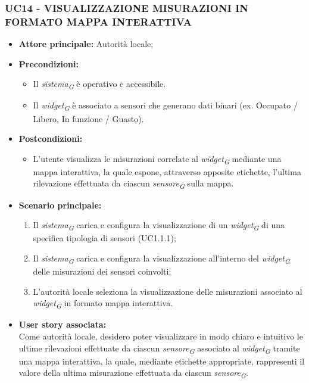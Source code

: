 \subsubsection{UC14 - VISUALIZZAZIONE MISURAZIONI IN FORMATO MAPPA INTERATTIVA}
\begin{itemize}
    \item \textbf{Attore principale:} Autorità locale;
    \item \textbf{Precondizioni:}
        \begin{itemize}
            \item Il \textit{sistema}\textsubscript{\textit{G}} è operativo e accessibile.
            \item Il \textit{widget}\textsubscript{\textit{G}} è associato a sensori che generano dati binari (ex. Occupato / Libero, In funzione / Guasto).
        \end{itemize}
    \item \textbf{Postcondizioni:}
        \begin{itemize}
            \item L'utente visualizza le misurazioni correlate al \textit{widget}\textsubscript{\textit{G}} mediante una mappa interattiva, la quale espone, attraverso apposite etichette, l'ultima rilevazione effettuata da ciascun \textit{sensore}\textsubscript{\textit{G}} sulla mappa.
        \end{itemize}
    \item \textbf{Scenario principale:}
        \begin{enumerate}
            \item Il \textit{sistema}\textsubscript{\textit{G}} carica e configura la visualizzazione di un \textit{widget}\textsubscript{\textit{G}} di una specifica tipologia di sensori (UC1.1.1);
            \item Il \textit{sistema}\textsubscript{\textit{G}} carica e configura la visualizzazione all'interno del \textit{widget}\textsubscript{\textit{G}} delle misurazioni dei sensori coinvolti;
            \item L'autorità locale seleziona la visualizzazione delle misurazioni associato al \textit{widget}\textsubscript{\textit{G}} in formato mappa interattiva.
        \end{enumerate}
    \item \textbf{User story associata:} \\
        Come autorità locale, desidero poter visualizzare in modo chiaro e intuitivo le ultime rilevazioni effettuate da ciascun \textit{sensore}\textsubscript{\textit{G}} associato al \textit{widget}\textsubscript{\textit{G}} tramite una mappa interattiva, la quale, mediante etichette appropriate, rappresenti il valore della ultima misurazione effettuata da ciascun \textit{sensore}\textsubscript{\textit{G}}.
\end{itemize}